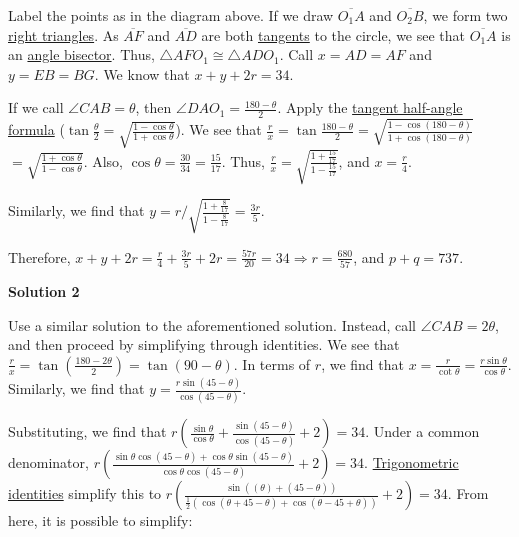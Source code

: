 \begin{enumerate}
 Label the points as in the diagram above. If we draw $\overline{O_1A}$ and $\overline{O_2B}$, we form two \href{https://artofproblemsolving.com/wiki/index.php?title=Right\_triangle}{right triangles}. As $\overline{AF}$ and $\overline{AD}$ are both \href{https://artofproblemsolving.com/wiki/index.php?title=Tangent}{tangents} to the circle, we see that $\overline{O_1A}$ is an \href{https://artofproblemsolving.com/wiki/index.php?title=Angle\_bisector}{angle bisector}. Thus, $\triangle AFO_1 \cong \triangle ADO_1$. Call $x = AD = AF$ and $y = EB = BG$. We know that $x + y + 2r = 34$. 

 If we call $\angle CAB = \theta$, then $\angle DAO_1 = \frac{180 - \theta}{2}$. Apply the \href{https://artofproblemsolving.com/wiki/index.php?title=Trigonometric\_identities}{tangent half-angle formula} ($\tan \frac{\theta}{2} = \sqrt{\frac{1 - \cos \theta}{1 + \cos \theta}}$). We see that $\frac rx = \tan \frac{180 - \theta}{2} = \sqrt{\frac{1 - \cos (180 - \theta)}{1 + \cos (180 - \theta)}}$$= \sqrt{\frac{1 + \cos \theta}{1 - \cos \theta}}$. Also, $\cos \theta = \frac{30}{34} = \frac{15}{17}$. Thus, $\frac rx = \sqrt{\frac{1 + \frac{15}{17}}{1 - \frac{15}{17}}}$, and $x = \frac{r}{4}$. 

 Similarly, we find that $y = r/\sqrt{\frac{1 + \frac{8}{17}}{1 - \frac{8}{17}}} = \frac{3r}{5}$.

 Therefore, $x + y + 2r = \frac{r}{4} + \frac{3r}{5} + 2r = \frac{57r}{20} = 34 \Longrightarrow r = \frac{680}{57}$, and $p + q = 737$.

 



\textbf{Solution 2}

Use a similar solution to the aforementioned solution. Instead, call $\angle CAB = 2\theta$, and then proceed by simplifying through identities. We see that $\frac rx = \tan \left(\frac{180 - 2\theta}{2}\right) = \tan (90 - \theta)$. In terms of $r$, we find that $x = \frac{r}{\cot \theta} = \frac{r\sin \theta}{\cos \theta}$. Similarly, we find that $y = \frac{r \sin(45 - \theta)}{\cos (45 - \theta)}$. 

 Substituting, we find that $r\left(\frac{\sin \theta}{\cos \theta} + \frac{\sin(45 - \theta)}{\cos (45 - \theta)} + 2\right) = 34$. Under a common denominator, $r\left(\frac{\sin \theta \cos (45 - \theta) + \cos \theta \sin (45 - \theta)}{\cos \theta \cos (45 - \theta)} + 2\right) = 34$. \href{https://artofproblemsolving.com/wiki/index.php?title=Trigonometric\_identities}{Trigonometric identities} simplify this to $r\left(\frac{\sin\left((\theta) + (45 - \theta)\right)}{\frac 12 \left(\cos (\theta + 45 - \theta) + \cos (\theta - 45 + \theta) \right)} + 2\right) = 34$. From here, it is possible to simplify:


\end{enumerate}
